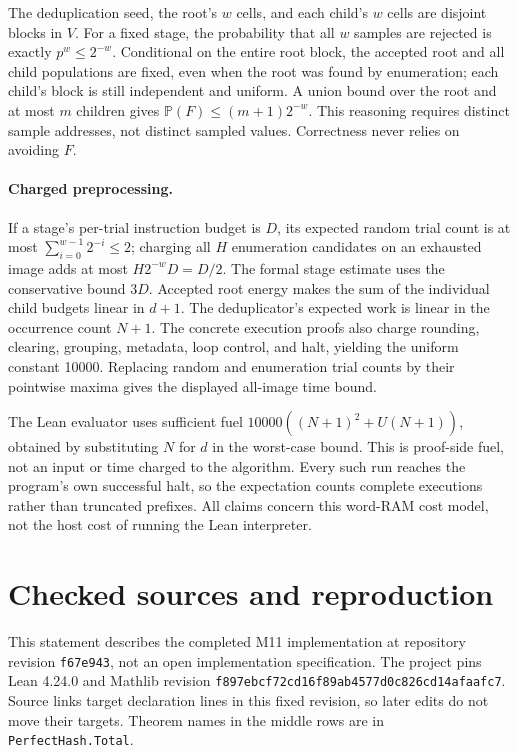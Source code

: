 \documentclass[11pt,a4paper]{article}
\theoremstyle{definition}
\newcommand{\Prb}{\mathbb P}
\newcommand{\code}[1]{\nolinkurl{#1}}
\begin{document}
The deduplication seed, the root's $w$ cells, and each child's $w$ cells are
disjoint blocks in $V$. For a fixed stage, the probability that all $w$
samples are rejected is exactly $p^w\le2^{-w}$. Conditional on the entire
root block, the accepted root and all child populations are fixed, even
when the root was found by enumeration; each child's block is still
independent and uniform. A union bound over the root and at most $m$
children gives $\Prb(F)\le(m+1)2^{-w}$. This reasoning requires distinct
sample addresses, not distinct sampled values. Correctness never relies
on avoiding $F$.

\paragraph{Charged preprocessing.}
If a stage's per-trial instruction budget is $D$, its expected random
trial count is at most $\sum_{i=0}^{w-1}2^{-i}\le2$; charging all $H$
enumeration candidates on an exhausted image adds at most
$H2^{-w}D=D/2$. The formal stage estimate uses the conservative bound
$3D$. Accepted root energy makes the sum of the individual child budgets
linear in $d+1$. The deduplicator's expected work is linear in the
occurrence count $N+1$. The concrete execution proofs also charge rounding,
clearing, grouping, metadata, loop control, and halt, yielding the uniform
constant 10000. Replacing random and enumeration trial counts by their
pointwise maxima gives the displayed all-image time bound.

The Lean evaluator uses sufficient fuel
$10000((N+1)^2+U(N+1))$, obtained by substituting $N$ for $d$ in the
worst-case bound. This is proof-side fuel, not an input or time charged
to the algorithm. Every such run reaches the program's own successful
halt, so the expectation counts complete executions rather than truncated
prefixes. All claims concern this word-RAM cost model, not the host cost of
running the Lean interpreter.

\section{Checked sources and reproduction}

This statement describes the completed M11 implementation at repository
revision \code{f67e943}, not an open implementation specification.
The project pins Lean 4.24.0 and Mathlib revision
\code{f897ebcf72cd16f89ab4577d0c826cd14afaafc7}.
Source links target declaration lines in this fixed revision, so later edits
do not move their targets. Theorem names in the middle rows are in
\code{PerfectHash.Total}.
\end{document}
